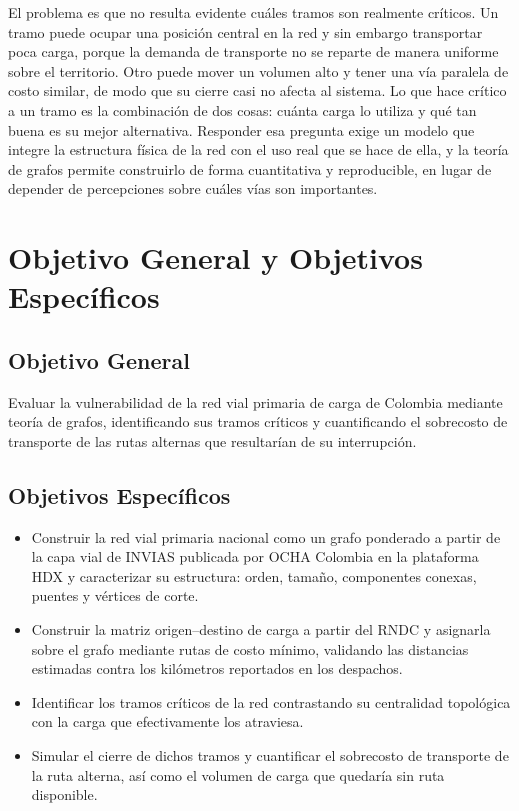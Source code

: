 \documentclass[conference]{IEEEtran}
\begin{document}
El problema es que no resulta evidente cuáles tramos son realmente críticos. Un
tramo puede ocupar una posición central en la red y sin embargo transportar poca
carga, porque la demanda de transporte no se reparte de manera uniforme sobre el
territorio. Otro puede mover un volumen alto y tener una vía paralela de costo
similar, de modo que su cierre casi no afecta al sistema. Lo que hace crítico a
un tramo es la combinación de dos cosas: cuánta carga lo utiliza y qué tan buena
es su mejor alternativa. Responder esa pregunta exige un modelo que integre la
estructura física de la red con el uso real que se hace de ella, y la teoría de
grafos permite construirlo de forma cuantitativa y reproducible, en lugar de
depender de percepciones sobre cuáles vías son importantes.

\section{Objetivo General y Objetivos Específicos}
\label{sec:objetivos}
\subsection{Objetivo General}
Evaluar la vulnerabilidad de la red vial primaria de carga de Colombia mediante
teoría de grafos, identificando sus tramos críticos y cuantificando el
sobrecosto de transporte de las rutas alternas que resultarían de su
interrupción.

\subsection{Objetivos Específicos}
\begin{itemize}
    \item Construir la red vial primaria nacional como un grafo ponderado a
    partir de la capa vial de INVIAS publicada por OCHA Colombia en la
    plataforma HDX \cite{ocha_hdx_roads} y caracterizar su estructura:
    orden, tamaño, componentes conexas, puentes y vértices de corte.

    \item Construir la matriz origen--destino de carga a partir del RNDC y
    asignarla sobre el grafo mediante rutas de costo mínimo, validando las
    distancias estimadas contra los kilómetros reportados en los despachos.

    \item Identificar los tramos críticos de la red contrastando su
    centralidad topológica con la carga que efectivamente los atraviesa.

    \item Simular el cierre de dichos tramos y cuantificar el sobrecosto de
    transporte de la ruta alterna, así como el volumen de carga que quedaría sin
    ruta disponible.
\end{itemize}
\end{document}
